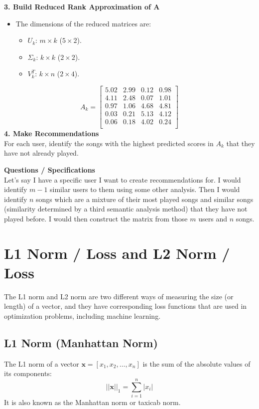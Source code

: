 \documentclass[12pt]{article}
\begin{document}
\textbf{3. Build Reduced Rank Approximation of A}\\
\begin{itemize}
\item The dimensions of the reduced matrices are:
    \begin{itemize}
    \item \(U_k\): \(m \times k\) (\(5 \times 2\)).
    \item \(\Sigma_k\): \(k \times k\) (\(2 \times 2\)).
    \item \(V_k^T\): \(k \times n\) (\(2 \times 4\)).
    \end{itemize}
\end{itemize}

\[
A_k = 
\begin{bmatrix}
5.02 & 2.99 & 0.12 & 0.98 \\
4.11 & 2.48 & 0.07 & 1.01 \\
0.97 & 1.06 & 4.68 & 4.81 \\
0.03 & 0.21 & 5.13 & 4.12 \\
0.06 & 0.18 & 4.02 & 0.24 \\
\end{bmatrix}
\]
\textbf{4. Make Recommendations}\\
For each user, identify the songs with the highest predicted scores in \(A_k\) that they have not already played. 

\textbf{Questions / Specifications}\\
Let's say I have a specific user I want to create recommendations for. I would identify \(m-1\) similar users to them using some other analysis. Then I would identify \(n\) songs which are a mixture of their most played songs and similar songs (similarity determined by a third semantic analysis method) that they have not played before. I would then construct the matrix from those \(m\) users and \(n\) songs. 

\section{L1 Norm / Loss and L2 Norm / Loss}

The L1 norm and L2 norm are two different ways of measuring the size (or length) of a vector, and they have corresponding loss functions that are used in optimization problems, including machine learning.

\subsection{L1 Norm (Manhattan Norm)}
The L1 norm of a vector \( \mathbf{x} = [x_1, x_2, \ldots, x_n] \) is the sum of the absolute values of its components:
\[ ||\mathbf{x}||_1 = \sum_{i=1}^{n} |x_i| \]
It is also known as the Manhattan norm or taxicab norm.
\end{document}
